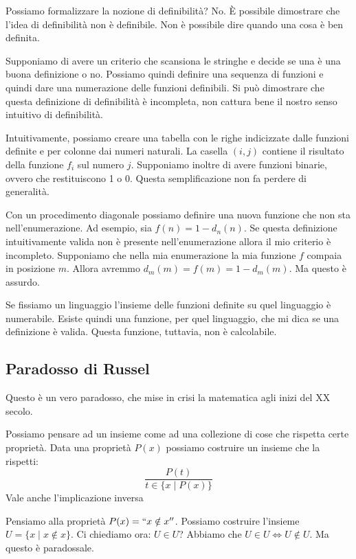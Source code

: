 Possiamo formalizzare la nozione di definibilità? No. È possibile dimostrare che l'idea di
definibilità non è definibile. Non è possibile dire quando una cosa è ben definita.

Supponiamo di avere un criterio che scansiona le stringhe e decide se una è una buona definizione o
no. Possiamo quindi definire una sequenza di funzioni e quindi dare una numerazione delle funzioni
definibili. Si può dimostrare che questa definizione di definibilità è incompleta, non cattura
bene il nostro senso intuitivo di definibilità. 

Intuitivamente, possiamo creare una tabella con le righe indicizzate dalle funzioni definite e per
colonne dai numeri naturali. La casella $(i,j)$ contiene il risultato della funzione $f_i$ sul
numero $j$. Supponiamo inoltre di avere funzioni binarie, ovvero che restituiscono 1 o 0. Questa
semplificazione non fa perdere di generalità. 

Con un procedimento diagonale possiamo definire una nuova funzione che non sta nell'enumerazione. Ad
esempio, sia $f(n) = 1 - d_{n}(n)$. Se questa definizione intuitivamente valida non è presente
nell'enumerazione allora il mio criterio è incompleto.  Supponiamo che nella mia enumerazione la
mia funzione $f$ compaia in posizione $m$. Allora avremmo $d_m(m) = f(m) = 1 - d_m(m)$. Ma questo è
assurdo.

Se fissiamo un linguaggio l'insieme delle funzioni definite su quel linguaggio è numerabile. Esiste
quindi una funzione, per quel linguaggio, che mi dica se una definizione è valida. Questa funzione,
tuttavia, non è calcolabile.

\subsection{Paradosso di Russel}

Questo è un vero paradosso, che mise in crisi la matematica agli inizi del XX secolo.

Possiamo pensare ad un insieme come ad una collezione di cose che rispetta certe proprietà. Data
una proprietà $P(x)$ possiamo costruire un insieme che la rispetti:
\begin{equation*}
    \frac{P(t)}{t \in \{x \mid P(x)\}} %
\end{equation*}
Vale anche l'implicazione inversa

Pensiamo alla proprietà $P(x) = ``x \notin x''$. Possiamo costruire l'insieme $U = \{x \mid x \notin x\}$. Ci
chiediamo ora: $U \in U$? Abbiamo che $U \in U \iff U \notin U$. Ma questo è paradossale.

